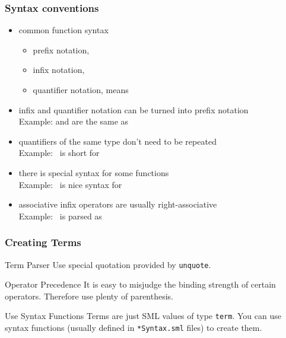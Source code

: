 \begin{frame}
\frametitle{Syntax conventions}
\begin{itemize}
\item common function syntax
\begin{itemize}
\item prefix notation, \eg {}
\item infix notation, \eg {}
\item quantifier notation, \eg {} means 
\end{itemize}
\item infix and quantifier notation can be turned into prefix notation \\
      Example:  and  are the same as 
\item quantifiers of the same type don't need to be repeated \\
   Example:\ 
    is short for
\item there is special syntax for some functions\\
   Example:\ 
    is nice syntax for
\item associative infix operators are usually right-associative\\
   Example:\ 
    is parsed as
   \hol{b1 \holAnd{} (b2 \holAnd{} b3)}
\end{itemize}
\end{frame}




\begin{frame}
\frametitle{Creating Terms}

\begin{block}{Term Parser}
Use special quotation provided by \texttt{unquote}.
\end{block}

\begin{alertblock}{Operator Precedence}
It is easy to misjudge the binding strength of certain operators. Therefore use plenty of parenthesis.
\end{alertblock}

\begin{block}{Use Syntax Functions}
Terms are just SML values of type \texttt{term}. You can use syntax functions (usually defined in \texttt{*Syntax.sml} files) to create them.
\end{block}
\end{frame}

